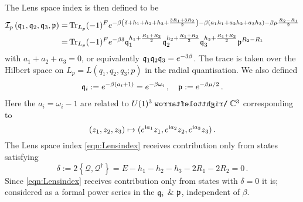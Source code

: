 \documentclass[main.tex]{subfiles}
\begin{document}
The Lens space index is then defined to be \cite{Bhattacharya:2008zy,Kim:2012ava,Kinney:2005ej,Lockhart:2012vp,Romelsberger:2005eg,Bak:2016vpi}
\begin{equation}
\begin{aligned}\label{eqn:Lensindex}
\mathcal{I}_{p}\left(\mathfrak{q}_1,\mathfrak{q}_2,\mathfrak{q}_3,\mathfrak{p}\right)=&\operatorname{Tr}_{L_p}(-1)^Fe^{-\beta\left(\delta+h_1+h_2+h_3+\frac{3R_1+3R_2}{2}\right)-\beta(a_1h_1+a_2h_2+a_3h_3)-\beta\mu\frac{R_2-R_1}{2}}\\
=&\operatorname{Tr}_{L_p}(-1)^Fe^{-\beta\delta}\mathfrak{q}_1^{h_1+\frac{R_1+R_2}{2}}\mathfrak{q}_2^{h_2+\frac{R_1+R_2}{2}}\mathfrak{q}_3^{h_3+\frac{R_1+R_2}{2}}\mathfrak{p}^{R_2-R_1}
\end{aligned}
\end{equation}
with $a_1+a_2+a_3=0$, or equivalently $\mathfrak{q}_1\mathfrak{q}_2\mathfrak{q}_3=e^{-3\beta}$. The trace is taken over the Hilbert space on $L_p=L(q_1,q_2,q_3;p)$ in the radial quantisation. We also defined 
\begin{align}\label{eqn:indexparamas}
\mathfrak{q}_i:=e^{-\beta(a_i+1)}=e^{-\beta\omega_i}\,,\quad\mathfrak{p}:=e^{-\beta\mu/2}\,.
\end{align}
Here the $a_i=\omega_i-1$ are related to $U(1)^3\acts\mathbb{C}^3$ corresponding to
\begin{equation}\label{eqn:u13action}
(z_1,z_2,z_3)\mapsto(e^{\mathrm{i} a_1}z_1,e^{\mathrm{i} a_2}z_2,e^{\mathrm{i} a_3}z_3)\,.
\end{equation}
The Lens space index \eqref{eqn:Lensindex} receives contribution only from states satisfying
\begin{equation}
\delta:=2\left\{\mathcal{Q},\mathcal{Q}^{\dagger}\right\}=E-h_1-h_2-h_3-2R_1-2R_2=0\,.
\end{equation}
Since \eqref{eqn:Lensindex} receives contribution only from states with $\delta=0$ it is; considered as a formal power series in the $\mathfrak{q}_i$ \& $\mathfrak{p}$, independent of $\beta$.  
\end{document}
